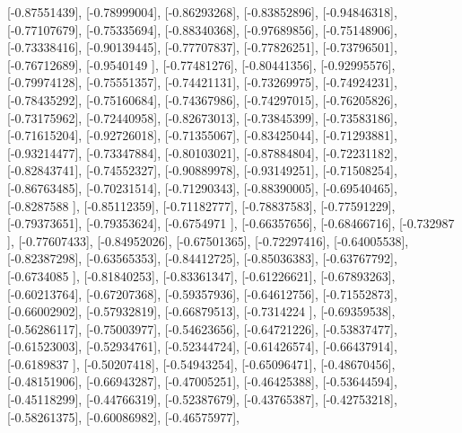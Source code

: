\documentclass{article}
\begin{document}
       [-0.87551439],
       [-0.78999004],
       [-0.86293268],
       [-0.83852896],
       [-0.94846318],
       [-0.77107679],
       [-0.75335694],
       [-0.88340368],
       [-0.97689856],
       [-0.75148906],
       [-0.73338416],
       [-0.90139445],
       [-0.77707837],
       [-0.77826251],
       [-0.73796501],
       [-0.76712689],
       [-0.9540149 ],
       [-0.77481276],
       [-0.80441356],
       [-0.92995576],
       [-0.79974128],
       [-0.75551357],
       [-0.74421131],
       [-0.73269975],
       [-0.74924231],
       [-0.78435292],
       [-0.75160684],
       [-0.74367986],
       [-0.74297015],
       [-0.76205826],
       [-0.73175962],
       [-0.72440958],
       [-0.82673013],
       [-0.73845399],
       [-0.73583186],
       [-0.71615204],
       [-0.92726018],
       [-0.71355067],
       [-0.83425044],
       [-0.71293881],
       [-0.93214477],
       [-0.73347884],
       [-0.80103021],
       [-0.87884804],
       [-0.72231182],
       [-0.82843741],
       [-0.74552327],
       [-0.90889978],
       [-0.93149251],
       [-0.71508254],
       [-0.86763485],
       [-0.70231514],
       [-0.71290343],
       [-0.88390005],
       [-0.69540465],
       [-0.8287588 ],
       [-0.85112359],
       [-0.71182777],
       [-0.78837583],
       [-0.77591229],
       [-0.79373651],
       [-0.79353624],
       [-0.6754971 ],
       [-0.66357656],
       [-0.68466716],
       [-0.732987  ],
       [-0.77607433],
       [-0.84952026],
       [-0.67501365],
       [-0.72297416],
       [-0.64005538],
       [-0.82387298],
       [-0.63565353],
       [-0.84412725],
       [-0.85036383],
       [-0.63767792],
       [-0.6734085 ],
       [-0.81840253],
       [-0.83361347],
       [-0.61226621],
       [-0.67893263],
       [-0.60213764],
       [-0.67207368],
       [-0.59357936],
       [-0.64612756],
       [-0.71552873],
       [-0.66002902],
       [-0.57932819],
       [-0.66879513],
       [-0.7314224 ],
       [-0.69359538],
       [-0.56286117],
       [-0.75003977],
       [-0.54623656],
       [-0.64721226],
       [-0.53837477],
       [-0.61523003],
       [-0.52934761],
       [-0.52344724],
       [-0.61426574],
       [-0.66437914],
       [-0.6189837 ],
       [-0.50207418],
       [-0.54943254],
       [-0.65096471],
       [-0.48670456],
       [-0.48151906],
       [-0.66943287],
       [-0.47005251],
       [-0.46425388],
       [-0.53644594],
       [-0.45118299],
       [-0.44766319],
       [-0.52387679],
       [-0.43765387],
       [-0.42753218],
       [-0.58261375],
       [-0.60086982],
       [-0.46575977],
\end{document}
